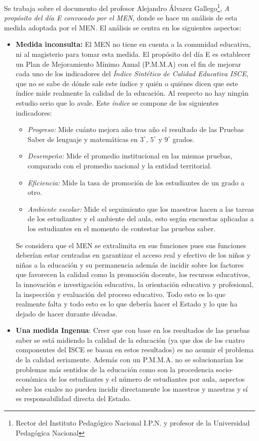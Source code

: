 \documentclass[10pt,letterpaper]{article}
\begin{document}
Se trabaja sobre el documento del profesor Alejandro Álvarez Gallego\footnote{Rector del Instituto Pedagógico Nacional I.P.N. y profesor de la Universidad Pedagógica Nacional}, \emph{A propósito del día E convocado por el MEN}, donde se hace un análisis de esta medida adoptada por el MEN. El análisis se centra en los siguientes aspectos:
\begin{itemize}
\item \textbf{Medida inconsulta:} El MEN no tiene en cuenta a la comunidad educativa, ni al magisterio para tomar esta medida. El propósito del día E es establecer un Plan de Mejoramiento Mínimo Anual (P.M.M.A) con el fin de mejorar cada uno de los indicadores del \emph{Índice Sintético de Calidad Educativa ISCE}, que no se sabe de dónde sale este índice y quién o quiénes dicen que este índice mide realmente la calidad de la educación. Al respecto no hay ningún estudio serio que lo avale. Este \emph{índice} se compone de los siguientes indicadores:
\begin{itemize}
\item \emph{Progreso:} Mide cuánto mejora año tras año el resultado de las Pruebas Saber de lenguaje y matemáticas en $3^{\circ}$, $5^{\circ}$ y $9^{\circ}$ grados.
\item \emph{Desempeño:} Mide el promedio institucional en las mismas pruebas, comparado con el promedio nacional y la entidad territorial.
\item \emph{Eficiencia:} Mide la tasa de promoción de los estudiantes de un grado a otro.
\item \emph{Ambiente escolar:} Mide el seguimiento que los maestros hacen a las tareas de los estudiantes y el ambiente del aula, esto según encuestas aplicadas a los estudiantes en el momento de contestar las pruebas saber.
\end{itemize}
Se considera que el MEN se extralimita en sus funciones pues sus funciones deberían estar centradas en garantizar el acceso real y efectivo de los niños y niñas a la educación y su permanencia además de incidir sobre los factores que favorecen la calidad como la promoción docente, los recursos educativos, la innovación e investigación educativa, la orientación educativa y profesional, la inspección y evaluación del proceso educativo. Todo esto es lo que realmente falta y todo esto es lo que debería hacer el Estado  y lo que ha dejado de hacer durante décadas.
\item \textbf{Una medida Ingenua}: Creer que con base en los resultados de las pruebas saber se está midiendo la calidad de la educación (ya que dos de los cuatro componentes del ISCE se basan en estos resultados) es no asumir el problema de la calidad seriamente. Además con un P.M.M.A. no se solucionarían los problemas más sentidos de la educación como son la procedencia socio-económica de los estudiantes y el número de estudiantes por aula, aspectos sobre los cuales no pueden incidir directamente los maestros y maestras y sí es responsabilidad directa del Estado.

\end{itemize}
\end{document}
